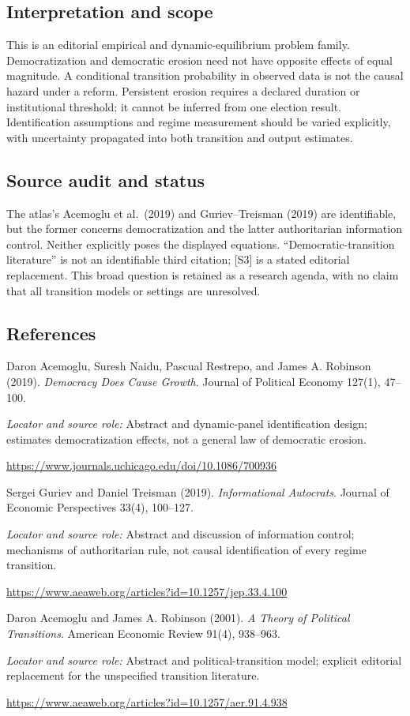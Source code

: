 \documentclass[11pt,a4paper]{article}
\begin{document}
\subsection*{Interpretation and scope}
This is an editorial empirical and dynamic-equilibrium problem family. Democratization and democratic erosion need not have opposite effects of equal magnitude. A conditional transition probability in observed data is not the causal hazard under a reform. Persistent erosion requires a declared duration or institutional threshold; it cannot be inferred from one election result. Identification assumptions and regime measurement should be varied explicitly, with uncertainty propagated into both transition and output estimates.
\subsection*{Source audit and status}
The atlas's Acemoglu et al.\ (2019) and Guriev--Treisman (2019) are identifiable, but the former concerns democratization and the latter authoritarian information control. Neither explicitly poses the displayed equations. ``Democratic-transition literature'' is not an identifiable third citation; [S3] is a stated editorial replacement. This broad question is retained as a research agenda, with no claim that all transition models or settings are unresolved.
\subsection*{References}
{\footnotesize\raggedright
\begin{enumerate}[label={\textbf{[S\arabic*]}},leftmargin=3em]
\item Daron Acemoglu, Suresh Naidu, Pascual Restrepo, and James A. Robinson (2019). \emph{Democracy Does Cause Growth}. Journal of Political Economy 127(1), 47--100.\par
\textit{Locator and source role:} Abstract and dynamic-panel identification design; estimates democratization effects, not a general law of democratic erosion.\par
\url{https://www.journals.uchicago.edu/doi/10.1086/700936}
\item Sergei Guriev and Daniel Treisman (2019). \emph{Informational Autocrats}. Journal of Economic Perspectives 33(4), 100--127.\par
\textit{Locator and source role:} Abstract and discussion of information control; mechanisms of authoritarian rule, not causal identification of every regime transition.\par
\url{https://www.aeaweb.org/articles?id=10.1257/jep.33.4.100}
\item Daron Acemoglu and James A. Robinson (2001). \emph{A Theory of Political Transitions}. American Economic Review 91(4), 938--963.\par
\textit{Locator and source role:} Abstract and political-transition model; explicit editorial replacement for the unspecified transition literature.\par
\url{https://www.aeaweb.org/articles?id=10.1257/aer.91.4.938}
\end{enumerate}
}
\end{document}
